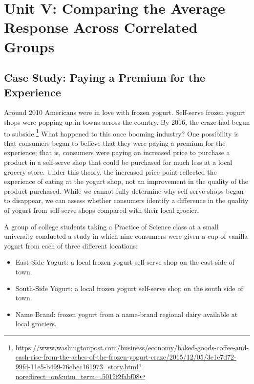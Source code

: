 \documentclass[
]{book}
\providecommand{\tightlist}{%
  \setlength{\itemsep}{0pt}\setlength{\parskip}{0pt}}
\theoremstyle{plain}
\theoremstyle{mydefn}
\theoremstyle{myexmpl}
\theoremstyle{remark}
\begin{document}
\hypertarget{part-unit-v-comparing-the-average-response-across-correlated-groups}{%
\part{Unit V: Comparing the Average Response Across Correlated Groups}\label{part-unit-v-comparing-the-average-response-across-correlated-groups}}

\hypertarget{CaseYogurt}{%
\chapter{Case Study: Paying a Premium for the Experience}\label{CaseYogurt}}

Around 2010 Americans were in love with frozen yogurt. Self-serve frozen yogurt shops were popping up in towns across the country. By 2016, the craze had begun to subside.\footnote{\url{https://www.washingtonpost.com/business/economy/baked-goods-coffee-and-cash-rise-from-the-ashes-of-the-frozen-yogurt-craze/2015/12/05/3c1e7d72-99fd-11e5-b499-76cbec161973_story.html?noredirect=on\&utm_term=.5012f2fabf08}} What happened to this once booming industry? One possibility is that consumers began to believe that they were paying a premium for the experience; that is, consumers were paying an increased price to purchase a product in a self-serve shop that could be purchased for much less at a local grocery store. Under this theory, the increased price point reflected the experience of eating at the yogurt shop, not an improvement in the quality of the product purchased. While we cannot fully determine why self-serve shops began to disappear, we can assess whether consumers identify a difference in the quality of yogurt from self-serve shops compared with their local grocier.

A group of college students taking a Practice of Science class at a small university conducted a study in which nine consumers were given a cup of vanilla yogurt from each of three different locations:

\begin{itemize}
\tightlist
\item
  East-Side Yogurt: a local frozen yogurt self-serve shop on the east side of town.
\item
  South-Side Yogurt: a local frozen yogurt self-serve shop on the south side of town.
\item
  Name Brand: frozen yogurt from a name-brand regional dairy available at local grociers.
\end{itemize}
\end{document}
